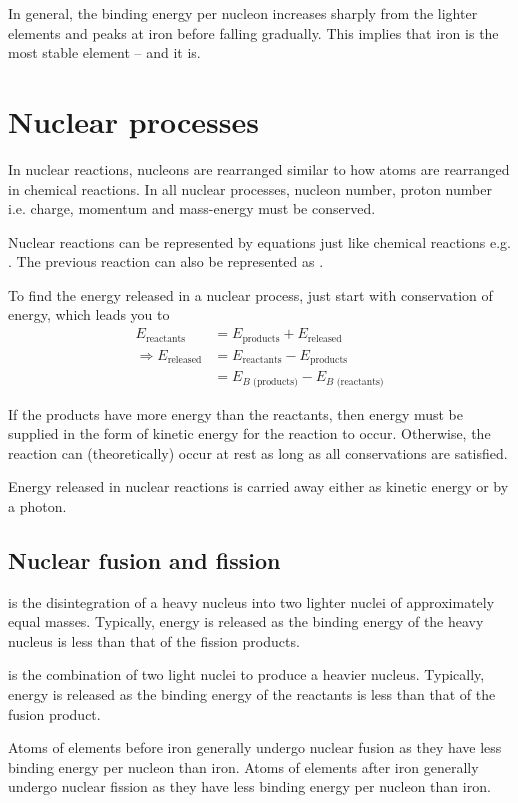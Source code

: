 \documentclass[Physics.tex]{subfiles}
\begin{document}
In general, the binding energy per nucleon increases sharply from the lighter elements and peaks at iron before falling gradually. This implies that iron is the most stable element -- and it is.
\section{Nuclear processes}
In nuclear reactions, nucleons are rearranged similar to how atoms are rearranged in chemical reactions. In all nuclear processes, nucleon number, proton number i.e. charge, momentum and mass-energy must be conserved.

Nuclear reactions can be represented by equations just like chemical reactions e.g. \mbox{}. The previous reaction can also be represented as \mbox{}.

To find the energy released in a nuclear process, just start with conservation of energy, which leads you to \begin{align}\nonumber E_\text{reactants} &= E_\text{products} + E_\text{released}\\\nonumber\Rightarrow E_\text{released} &= E_\text{reactants} - E_\text{products}\\&= E_{B\text{ (products)}} - E_{B\text{ (reactants)}}\end{align}

If the products have more energy than the reactants, then energy must be supplied in the form of kinetic energy for the reaction to occur. Otherwise, the reaction can (theoretically) occur at rest as long as all conservations are satisfied.

Energy released in nuclear reactions is carried away either as kinetic energy or by a photon.
\subsection{Nuclear fusion and fission}
 is the disintegration of a heavy nucleus into two lighter nuclei of approximately equal masses. Typically, energy is released as the binding energy of the heavy nucleus is less than that of the fission products.

 is the combination of two light nuclei to produce a heavier nucleus. Typically, energy is released as the binding energy of the reactants is less than that of the fusion product.

Atoms of elements before iron generally undergo nuclear fusion as they have less binding energy per nucleon than iron. Atoms of elements after iron generally undergo nuclear fission as they have less binding energy per nucleon than iron.
\end{document}
